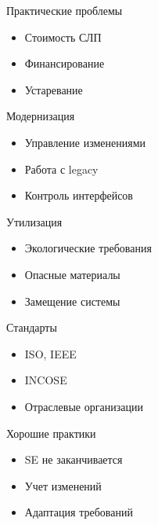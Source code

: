 \documentclass{beamer}
\begin{document}

\begin{frame}{Практические проблемы}
\begin{itemize}
    \item Стоимость СЛП
    \item Финансирование
    \item Устаревание
\end{itemize}

\end{frame}


\begin{frame}{Модернизация}
\begin{itemize}
    \item Управление изменениями
    \item Работа с legacy
    \item Контроль интерфейсов
\end{itemize}

\end{frame}


\begin{frame}{Утилизация}
\begin{itemize}
    \item Экологические требования
    \item Опасные материалы
    \item Замещение системы
\end{itemize}

\end{frame}


\begin{frame}{Стандарты}
\begin{itemize}
    \item ISO, IEEE
    \item INCOSE
    \item Отраслевые организации
\end{itemize}

\end{frame}


\begin{frame}{Хорошие практики}
\begin{itemize}
    \item SE не заканчивается
    \item Учет изменений
    \item Адаптация требований
\end{itemize}

\end{frame}
\end{document}

